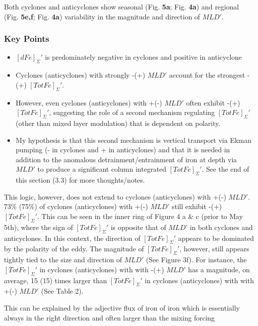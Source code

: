 Both cyclones and anticyclones show seasonal (Fig. \textbf{5a}; Fig. \textbf{4a}) and regional (Fig. \textbf{5e,f}; Fig. \textbf{4a}) variability in the magnitude and direction of $MLD'$. 


\vspace{3mm}
\subsubsection*{Key Points}
\begin{itemize}
\item $[dFe]_\Sigma'$ is predominately negative in cyclones and positive in anticyclone
\item Cyclones (anticyclones) with strongly -(+) $MLD'$ account for the strongest -(+) $[TotFe]_\Sigma'$. 
\item However, even cyclones (anticyclones) with +(-) $MLD'$ often exhibit -(+)$[TotFe]_\Sigma'$, suggesting the role of a second mechanism regulating $[TotFe]_\Sigma'$ (other than mixed layer modulation) that is dependent on polarity.
\item  My hypothesis is that this second mechanism is vertical transport via Ekman pumping (- in cyclones and + in anticyclones) and that it is needed in addition to the anomalous detrainment/entrainment of iron at depth via $MLD'$ to produce a significant column integrated $[TotFe]_\Sigma'$. See the end of this section (3.3) for more thoughts/notes.
\end{itemize}
%




This logic, however, does not extend to cyclones (anticyclones) with +(-) $MLD'$. 73\% (75\%) of cyclones (anticyclones) with +(-) $MLD’$ still exhibit -(+) $[TotFe]_\Sigma'$. This can be seen in the inner ring of Figure 4 a \& c (prior to May 5th), where the sign of $[TotFe]_\Sigma'$ is opposite that of $MLD’$ in both cyclones and anticyclones. In this context, the direction of $[TotFe]_\Sigma'$ appears to be dominated by the polarity of the eddy. The magnitude of $[TotFe]_\Sigma'$, however, still appears tightly tied to the size and direction of $MLD'$ (See Figure 3f). For instance, the $[TotFe]_\Sigma'$ in cyclones (anticyclones) with with -(+) $MLD'$ has a magnitude, on average, 15 (15) times larger than  $[TotFe]_\Sigma'$ in cyclones (anticyclones) with with +(-) $MLD'$ (See Table 2).

This can be explained by the adjective flux of iron of iron which is essentially always in the right direction and often larger than the mixing forcing


